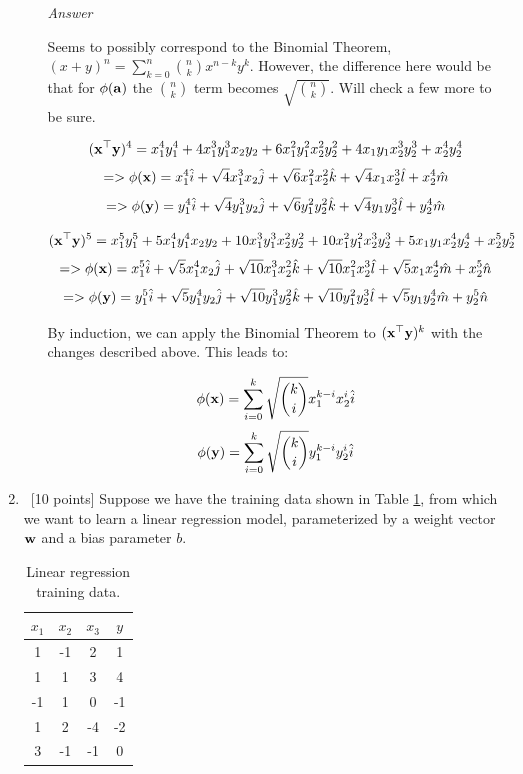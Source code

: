 \documentclass[12pt, fullpage,letterpaper]{article}
\begin{document}
\begin{enumerate}
\begin{enumerate}
		\emph{Answer}
		
		Seems to possibly correspond to the Binomial Theorem, $(x+y)^n = \sum_{k=0}^n {n \choose k}x^{n-k}y^k$. However, the difference here would be that for $\phi({\bf a})$ the $n \choose k$ term becomes $\sqrt{n \choose k}$. Will check a few more to be sure.
		
		\[
		    ({\bf x}^\top {\bf y})^4 = x_1^4y_1^4 + 4x_1^3y_1^3x_2y_2 + 6x_1^2y_1^2x_2^2y_2^2 + 4x_1y_1x_2^3y_2^3 + x_2^4y_2^4
		\]
		\[
            => \phi({\bf x}) = x_1^4\hat{i} + \sqrt{4}x_1^3x_2\hat{j} + \sqrt{6}x_1^2x_2^2\hat{k} + \sqrt{4}x_1x_2^3\hat{l} + x_2^4\hat{m}
        \]
		\[
            => \phi({\bf y}) = y_1^4\hat{i} + \sqrt{4}y_1^3y_2\hat{j} + \sqrt{6}y_1^2y_2^2\hat{k} + \sqrt{4}y_1y_2^3\hat{l} + y_2^4\hat{m}
        \]
        
        \[
		    ({\bf x}^\top {\bf y})^5 = x_1^5y_1^5 + 5x_1^4y_1^4x_2y_2 + 10x_1^3y_1^3x_2^2y_2^2 + 10x_1^2y_1^2x_2^3y_2^3 + 5x_1y_1x_2^4y_2^4 + x_2^5y_2^5
		\]
		\[
            => \phi({\bf x}) = x_1^5\hat{i} + \sqrt{5}x_1^4x_2\hat{j} + \sqrt{10}x_1^3x_2^2\hat{k} + \sqrt{10}x_1^2x_2^3\hat{l} + \sqrt{5}x_1x_2^4\hat{m} + x_2^5\hat{n}
        \]
		\[
            => \phi({\bf y}) = y_1^5\hat{i} + \sqrt{5}y_1^4y_2\hat{j} + \sqrt{10}y_1^3y_2^2\hat{k} + \sqrt{10}y_1^2y_2^3\hat{l} + \sqrt{5}y_1y_2^4\hat{m} + y_2^5\hat{n}
        \]
        
        By induction, we can apply the Binomial Theorem to $({\bf x}^\top {\bf y})^k$ with the changes described above. This leads to:
        
        \[
            \phi({\bf x}) = \sum_{i=0}^k \sqrt{k \choose i} x_1^{k-i} x_2^{i} \hat{i}
        \]
        \[
            \phi({\bf y}) = \sum_{i=0}^k \sqrt{k \choose i} y_1^{k-i} y_2^{i} \hat{i}
        \]
		
	\end{enumerate}

\item~[10 points] Suppose we have the training data shown in Table \ref{tb:1}, from which we want to learn a linear regression model, parameterized by a weight vector ${\bf w}$ and a bias parameter $b$.  
\begin{table}
	\centering
	\begin{tabular}{ccc|c}
		$x_1 $ & $x_2$ & $x_3$ &  $y$\\ 
		\hline\hline
		1 & -1 & 2 & 1 \\ \hline
		1 & 1 & 3 & 4 \\ \hline
		-1 & 1 & 0 & -1 \\ \hline
		1 & 2 & -4 & -2 \\ \hline
		3 & -1 & -1 & 0\\ \hline
	\end{tabular}
	\caption{Linear regression training data.}\label{tb:1}
\end{table}


\end{enumerate}
\end{document}
